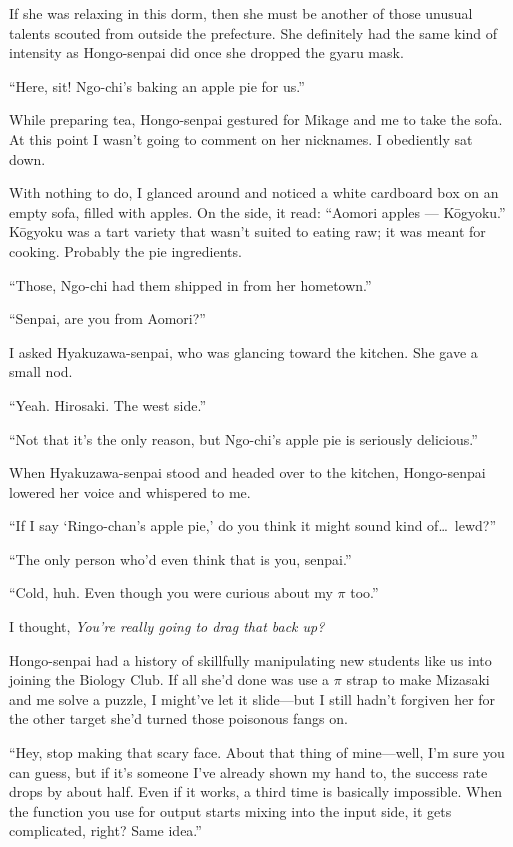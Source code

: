 \documentclass[
    a4paper,
    12pt,
    twoside,
    openany,
    UTF8,
    fontset=windows
]{ctexbook}
\begin{document}
If she was relaxing in this dorm, then she must be another of those unusual talents scouted from outside the prefecture. She definitely had the same kind of intensity as Hongo-senpai did once she dropped the gyaru mask.

``Here, sit! Ngo-chi's baking an apple pie for us.''

While preparing tea, Hongo-senpai gestured for Mikage and me to take the sofa. At this point I wasn't going to comment on her nicknames. I obediently sat down.

With nothing to do, I glanced around and noticed a white cardboard box on an empty sofa, filled with apples. On the side, it read: ``Aomori apples --- K\=ogyoku.'' K\=ogyoku was a tart variety that wasn't suited to eating raw; it was meant for cooking. Probably the pie ingredients.

``Those, Ngo-chi had them shipped in from her hometown.''

``Senpai, are you from Aomori?''

I asked Hyakuzawa-senpai, who was glancing toward the kitchen. She gave a small nod.

``Yeah. Hirosaki. The west side.''

``Not that it's the only reason, but Ngo-chi's apple pie is seriously delicious.''

When Hyakuzawa-senpai stood and headed over to the kitchen, Hongo-senpai lowered her voice and whispered to me.

``If I say `Ringo-chan's apple pie,' do you think it might sound kind of\dots\ lewd?''

``The only person who'd even think that is you, senpai.''

``Cold, huh. Even though you were curious about my $\pi$ too.''

I thought, \textit{You're really going to drag that back up?}

Hongo-senpai had a history of skillfully manipulating new students like us into joining the Biology Club. If all she'd done was use a $\pi$ strap to make Mizasaki and me solve a puzzle, I might've let it slide---but I still hadn't forgiven her for the other target she'd turned those poisonous fangs on.

``Hey, stop making that scary face. About that thing of mine---well, I'm sure you can guess, but if it's someone I've already shown my hand to, the success rate drops by about half. Even if it works, a third time is basically impossible. When the function you use for output starts mixing into the input side, it gets complicated, right? Same idea.''
\end{document}
